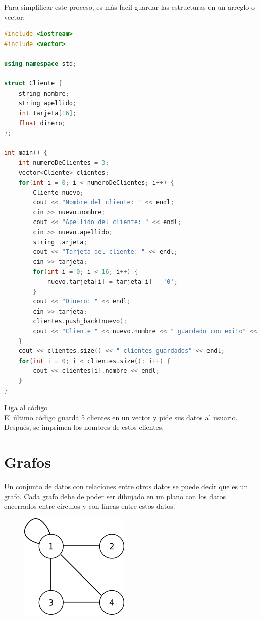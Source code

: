 \documentclass{article}
\begin{document}
Para simplificar este proceso, es más facil guardar las estructuras en un arreglo o vector:

\begin{lstlisting}[language=C++, caption=Clientes bancarios]
#include <iostream>
#include <vector>

using namespace std;

struct Cliente {
    string nombre;
    string apellido;
    int tarjeta[16];
    float dinero;
};

int main() {
    int numeroDeClientes = 3;
    vector<Cliente> clientes;
    for(int i = 0; i < numeroDeClientes; i++) {
        Cliente nuevo;
        cout << "Nombre del cliente: " << endl;
        cin >> nuevo.nombre;
        cout << "Apellido del cliente: " << endl;
        cin >> nuevo.apellido;
        string tarjeta;
        cout << "Tarjeta del cliente: " << endl;
        cin >> tarjeta;
        for(int i = 0; i < 16; i++) {
            nuevo.tarjeta[i] = tarjeta[i] - '0';
        }
        cout << "Dinero: " << endl;
        cin >> tarjeta;
        clientes.push_back(nuevo);
        cout << "Cliente " << nuevo.nombre << " guardado con exito" << endl;
    }
    cout << clientes.size() << " clientes guardados" << endl;
    for(int i = 0; i < clientes.size(); i++) {
        cout << clientes[i].nombre << endl;
    }
}
\end{lstlisting}
\href{https://repl.it/@Jamesscn/Structs}{Liga al código} \\

El último código guarda 5 clientes en un vector y pide sus datos al usuario. Después, se imprimen los nombres de estos clientes.

\section{Grafos}

Un conjunto de datos con relaciones entre otros datos se puede decir que es un grafo. Cada grafo debe de poder ser dibujado en un plano con los datos encerrados entre circulos y con líneas entre estos datos.

\begin{figure}[H]
    \centering
    \includegraphics[width=0.15\paperwidth]{grafo}
\end{figure}
\end{document}

